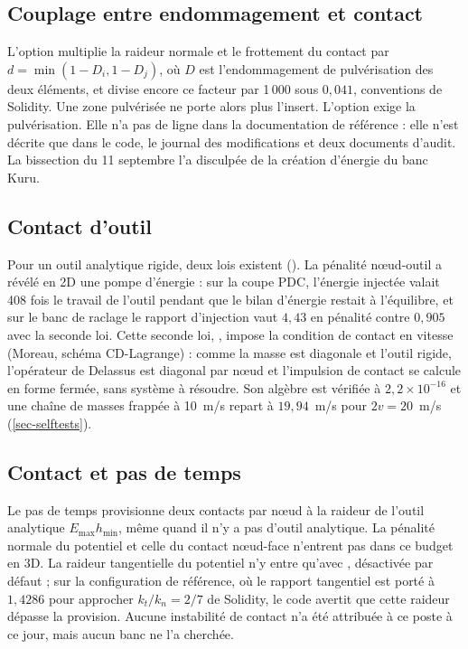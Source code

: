\subsection{Couplage entre endommagement et contact}

L'option  multiplie la raideur normale et le frottement du contact par $d = \min(1 - D_i, 1 - D_j)$, où $D$ est l'endommagement de pulvérisation des deux éléments, et divise encore ce facteur par 1\,000 sous $0{,}041$, conventions de Solidity. Une zone pulvérisée ne porte alors plus l'insert. L'option exige la pulvérisation. Elle n'a pas de ligne dans la documentation de référence : elle n'est décrite que dans le code, le journal des modifications et deux documents d'audit. La bissection du 11 septembre l'a disculpée de la création d'énergie du banc Kuru.

\subsection{Contact d'outil}

Pour un outil analytique rigide, deux lois existent (). La pénalité nœud-outil a révélé en 2D une pompe d'énergie : sur la coupe PDC, l'énergie injectée valait 408 fois le travail de l'outil pendant que le bilan d'énergie restait à l'équilibre, et sur le banc de raclage le rapport d'injection vaut $4{,}43$ en pénalité contre $0{,}905$ avec la seconde loi. Cette seconde loi, , impose la condition de contact en vitesse (Moreau, schéma CD-Lagrange) : comme la masse est diagonale et l'outil rigide, l'opérateur de Delassus est diagonal par nœud et l'impulsion de contact se calcule en forme fermée, sans système à résoudre. Son algèbre est vérifiée à $2{,}2\times10^{-16}$ et une chaîne de masses frappée à 10~m/s repart à $19{,}94$~m/s pour $2v = 20$~m/s (\cref{sec-selftests}).

\subsection{Contact et pas de temps}
\label{sec-contact-dt}

Le pas de temps provisionne deux contacts par nœud à la raideur de l'outil analytique $E_\text{max} h_\text{min}$, même quand il n'y a pas d'outil analytique. La pénalité normale du potentiel et celle du contact nœud-face n'entrent pas dans ce budget en 3D. La raideur tangentielle du potentiel n'y entre qu'avec , désactivée par défaut ; sur la configuration de référence, où le rapport tangentiel est porté à $1{,}4286$ pour approcher $k_t/k_n = 2/7$ de Solidity, le code avertit que cette raideur dépasse la provision. Aucune instabilité de contact n'a été attribuée à ce poste à ce jour, mais aucun banc ne l'a cherchée.

